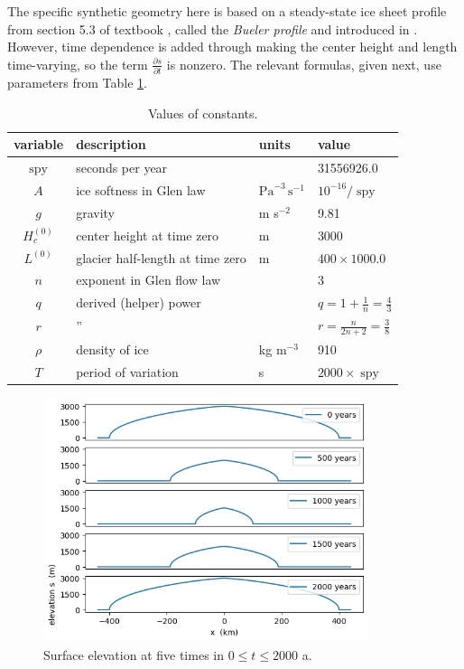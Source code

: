 \documentclass[letterpaper,final,12pt,reqno]{amsart}
\newcommand{\spy}{\operatorname{spy}}
\begin{document}
The specific synthetic geometry here is based on a steady-state ice sheet profile from section 5.3 of textbook \cite{vanderVeen2013}, called the \emph{Bueler profile} and introduced in \cite{Bueler2003}.  However, time dependence is added through making the center height and length time-varying, so the term $\frac{\partial s}{\partial t}$ is nonzero.  The relevant formulas, given next, use parameters from Table \ref{constantstable}.

\begin{table}
\begin{tabular}{clll}
variable  & description & units & value \\
\hline
$\spy$ & seconds per year &  & 31556926.0 \\
$A$ & ice softness in Glen law & $\text{Pa}^{-3}\,\text{s}^{-1}$ & $10^{-16}/\spy$ \\
$g$ & gravity & m s$^{-2}$ & 9.81 \\
$H_c^{(0)}$ & center height at time zero & m & 3000 \\
$L^{(0)}$ & glacier half-length at time zero & m & $400 \times 1000.0$ \\
$n$ & exponent in Glen flow law & & 3 \\
$q$ & derived (helper) power & & $q = 1+\frac{1}{n} = \frac{4}{3}$ \\
$r$ & \qquad '' & & $r = \frac{n}{2n+2} = \frac{3}{8}$ \\
$\rho$ & density of ice & kg m$^{-3}$ & 910 \\
$T$ & period of variation & s & $2000 \times \spy$
\end{tabular}
\bigskip
\caption{Values of constants.}
\label{constantstable}
\end{table}

\begin{figure}[t]
\includegraphics[width=0.85\textwidth]{surfacesnaps}
\caption{Surface elevation at five times in $0\le t \le 2000$ a.}
\label{surfacesnaps}
\end{figure}
\end{document}
